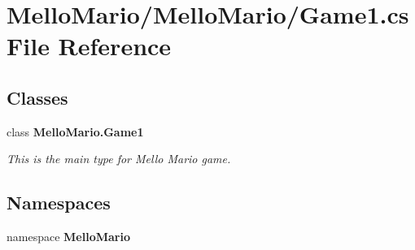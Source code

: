 \section{Mello\+Mario/\+Mello\+Mario/\+Game1.cs File Reference}
\label{Game1_8cs}
\subsection*{Classes}
\begin{DoxyCompactItemize}
\item 
class \textbf{ Mello\+Mario.\+Game1}
\begin{DoxyCompactList}\small\item\em This is the main type for Mello Mario game. \end{DoxyCompactList}\end{DoxyCompactItemize}
\subsection*{Namespaces}
\begin{DoxyCompactItemize}
\item 
namespace \textbf{ Mello\+Mario}
\end{DoxyCompactItemize}
